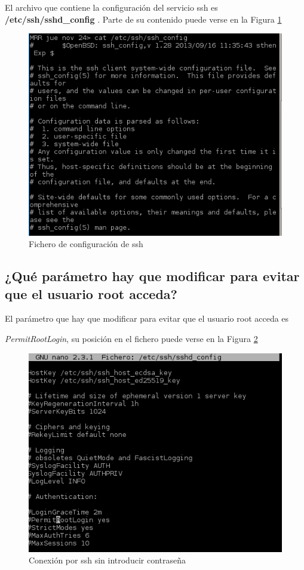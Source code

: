El archivo que contiene la configuración del servicio ssh es \textbf{ /etc/ssh/sshd\_config} \cite{enlace19}. Parte de su contenido puede verse en la Figura \ref{fig:figura102}
	
	\begin{figure}[H] %
		\centering
		\includegraphics[scale=0.6]{figuras/figura102.png} 
		\caption{Fichero de configuración de ssh} 
		\label{fig:figura102}
	\end{figure}
\subsection{¿Qué parámetro hay que modificar para evitar que el usuario root
	acceda?}

El parámetro que hay que modificar para evitar que el usuario root acceda es 

\textit{PermitRootLogin}, su posición en el fichero puede verse en la Figura \ref{fig:figura103}

\begin{figure}[H] %
	\centering
	\includegraphics[scale=0.6]{figuras/figura103.png} 
	\caption{Conexión por ssh sin introducir contraseña} 
	\label{fig:figura103}
\end{figure}

